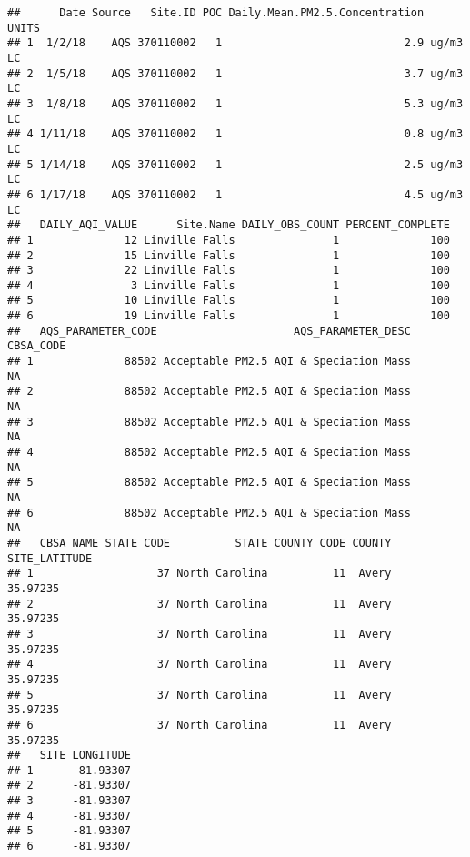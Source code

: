 \documentclass[]{article}
\newenvironment{Shaded}{\begin{snugshade}}{\end{snugshade}}
\newcommand{\KeywordTok}[1]{\textcolor[rgb]{0.13,0.29,0.53}{\textbf{#1}}}
\newcommand{\FloatTok}[1]{\textcolor[rgb]{0.00,0.00,0.81}{#1}}
\newcommand{\CommentTok}[1]{\textcolor[rgb]{0.56,0.35,0.01}{\textit{#1}}}
\newcommand{\OperatorTok}[1]{\textcolor[rgb]{0.81,0.36,0.00}{\textbf{#1}}}
\newcommand{\NormalTok}[1]{#1}
\begin{document}
\begin{verbatim}
##      Date Source   Site.ID POC Daily.Mean.PM2.5.Concentration    UNITS
## 1  1/2/18    AQS 370110002   1                            2.9 ug/m3 LC
## 2  1/5/18    AQS 370110002   1                            3.7 ug/m3 LC
## 3  1/8/18    AQS 370110002   1                            5.3 ug/m3 LC
## 4 1/11/18    AQS 370110002   1                            0.8 ug/m3 LC
## 5 1/14/18    AQS 370110002   1                            2.5 ug/m3 LC
## 6 1/17/18    AQS 370110002   1                            4.5 ug/m3 LC
##   DAILY_AQI_VALUE      Site.Name DAILY_OBS_COUNT PERCENT_COMPLETE
## 1              12 Linville Falls               1              100
## 2              15 Linville Falls               1              100
## 3              22 Linville Falls               1              100
## 4               3 Linville Falls               1              100
## 5              10 Linville Falls               1              100
## 6              19 Linville Falls               1              100
##   AQS_PARAMETER_CODE                     AQS_PARAMETER_DESC CBSA_CODE
## 1              88502 Acceptable PM2.5 AQI & Speciation Mass        NA
## 2              88502 Acceptable PM2.5 AQI & Speciation Mass        NA
## 3              88502 Acceptable PM2.5 AQI & Speciation Mass        NA
## 4              88502 Acceptable PM2.5 AQI & Speciation Mass        NA
## 5              88502 Acceptable PM2.5 AQI & Speciation Mass        NA
## 6              88502 Acceptable PM2.5 AQI & Speciation Mass        NA
##   CBSA_NAME STATE_CODE          STATE COUNTY_CODE COUNTY SITE_LATITUDE
## 1                   37 North Carolina          11  Avery      35.97235
## 2                   37 North Carolina          11  Avery      35.97235
## 3                   37 North Carolina          11  Avery      35.97235
## 4                   37 North Carolina          11  Avery      35.97235
## 5                   37 North Carolina          11  Avery      35.97235
## 6                   37 North Carolina          11  Avery      35.97235
##   SITE_LONGITUDE
## 1      -81.93307
## 2      -81.93307
## 3      -81.93307
## 4      -81.93307
## 5      -81.93307
## 6      -81.93307
\end{verbatim}

\begin{Shaded}
\end{Shaded}
\end{document}
